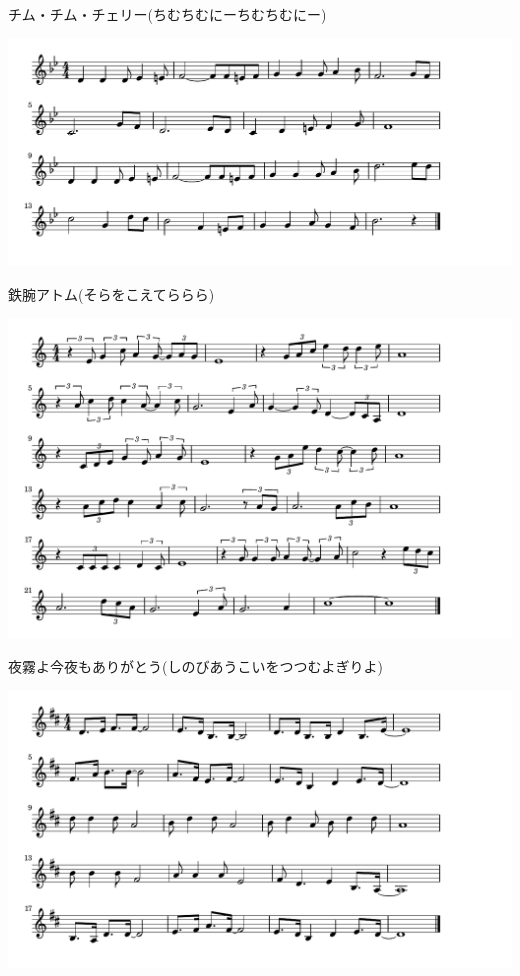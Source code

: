 \documentclass[a4paper]{ltjsarticle}
\begin{document}
\vspace{-10mm} \hspace{10mm}
チム・チム・チェリー(ちむちむにーちむちむにー)

\includegraphics[clip]{tetsuwan_crop.pdf}

\vspace{-10mm} \hspace{10mm}
鉄腕アトム(そらをこえてららら)

\includegraphics[clip]{yogiriyo_crop.pdf}

\vspace{-10mm} \hspace{10mm}
夜霧よ今夜もありがとう(しのびあうこいをつつむよぎりよ)


\includegraphics[clip]{hoshinonagareni_crop.pdf}
\end{document}
